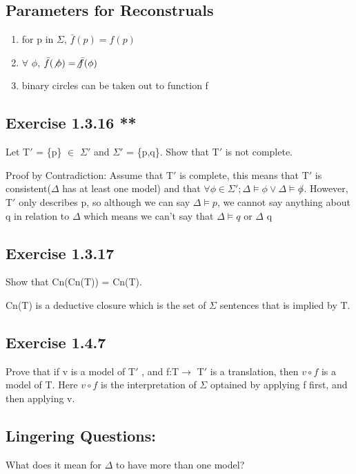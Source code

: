 \documentclass[11pt]{article}
\begin{document}
\subsection{Parameters for Reconstruals}
\label{sec:orgb9810b8}

\begin{enumerate}
\item for p in \(\Sigma\), \(\bar{f} (p) = f(p)\)
\item \(\forall\) \(\phi\), \(\bar{f}(\not \phi) = \not \bar{f}(\phi)\)
\item binary circles can be taken out to function f
\end{enumerate}

\subsection{Exercise 1.3.16 **}
\label{sec:org0af5b97}
Let T\(\prime\) = \{p\} \(\in\) \(\Sigma \prime\) and \(\Sigma \prime\) = \{p,q\}. Show that T\(\prime\) is not complete.

Proof by Contradiction:
Assume that T\(\prime\) is complete, this means that T\(\prime\) is consistent(\(\Delta\) has at least one model) and that
\(\forall \phi \in \Sigma\prime;\Delta \vDash \phi \vee \Delta \vDash \not \phi\).
However, T\(\prime\) only describes p,  so although we can say \(\Delta \vDash p\), 
we cannot say anything about q in relation to \(\Delta\) which means we can't say that \(\Delta \vDash q\) or \(\Delta\)\vDash \textlnot{} q 

\subsection{Exercise 1.3.17}
\label{sec:org711e317}
Show that Cn(Cn(T)) = Cn(T).

Cn(T) is a deductive closure which is the set of \(\Sigma\) sentences that is implied by T.

\subsection{Exercise 1.4.7}
\label{sec:org6e72c7d}
Prove that if v is a model of T\(\prime\) , and f:T\(\rightarrow\) T\(\prime\) is a translation, then
\(v \circ f\) is a model of T. Here \(v \circ f\) is the interpretation of \(\Sigma\) optained by applying
f first, and then applying v.


\subsection{Lingering Questions:}
\label{sec:org3cc7420}
What does it mean for \(\Delta\) to have more than one model?
\end{document}
